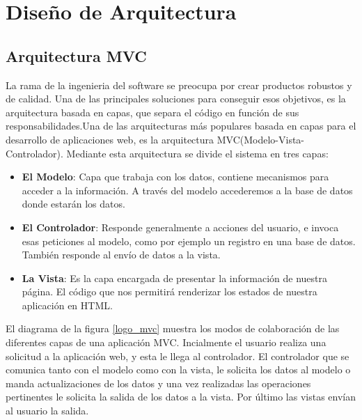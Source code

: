 \section{Diseño de Arquitectura}

\subsection{Arquitectura MVC}

La rama de la ingenieria del software se preocupa por crear productos robustos y de calidad. Una de las principales soluciones para conseguir esos objetivos, es la arquitectura basada en capas, que separa el código en función de sus responsabilidades.Una de las arquitecturas más populares basada en capas para el desarrollo de aplicaciones web, es la arquitectura MVC(Modelo-Vista-Controlador). Mediante esta arquitectura se divide el sistema en tres capas:

\begin{itemize}

\item \textbf{El Modelo}: Capa que trabaja con los datos, contiene mecanismos para acceder a la información. A través del modelo accederemos a la base de datos donde estarán los datos.
\item \textbf{El Controlador}: Responde generalmente a acciones del usuario, e invoca esas peticiones al modelo, como por ejemplo un registro en una base de datos. También responde al envío de datos a la vista.
\item \textbf{La Vista}: Es la capa encargada de presentar la información de nuestra página. El código que nos permitirá renderizar los estados de nuestra aplicación en HTML.

\end{itemize}

\vspace{5 mm}

El diagrama de la figura \ref{logo_mvc} muestra los modos de colaboración de las diferentes capas de una aplicación MVC. Incialmente el usuario realiza una solicitud a la aplicación web, y esta le llega al controlador. El controlador que se comunica tanto con el modelo como con la vista, le solicita los datos al modelo o manda actualizaciones de los datos y una vez realizadas las operaciones pertinentes le solicita la salida de los datos a la vista. Por último las vistas envían al usuario la salida.


